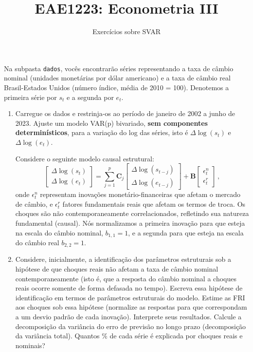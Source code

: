 \documentclass[10pt,a4paper]{article}
\title{\large EAE1223: Econometria III}
\author{\normalsize Exercícios sobre SVAR}
\date{}
\begin{document}
	\maketitle
	Na subpasta \texttt{dados}, vocês encontrarão séries representando a taxa de câmbio nominal (unidades monetárias por dólar americano) e a taxa de câmbio real Brasil-Estados Unidos (número índice, média de 2010 = 100). Denotemos a primeira série por $s_t$ e a segunda por $e_t$.

\begin{enumerate}
	\item Carregue os dados e restrinja-os ao período de janeiro de 2002 a junho de 2023. Ajuste um modelo VAR(p) bivariado, \textbf{sem componentes determinísticos}, para a variação do log das séries, isto é $\Delta \log(s_t)$ e $\Delta \log(e_t)$.
	
	\vspace{2em}
	 Considere o seguinte modelo causal estrutural:
$$\begin{bmatrix}
	\Delta \log(s_t) \\
	\Delta \log(e_t)
\end{bmatrix} = \sum_{j=1}^p \boldsymbol{C}_j \begin{bmatrix}
\Delta \log(s_{t-j}) \\
\Delta \log(e_{t-j})
\end{bmatrix} + \boldsymbol{B}\begin{bmatrix}
\epsilon^n_t \\
\epsilon^r_t
\end{bmatrix}\,,$$
onde $\epsilon^n_t$ representam inovações monetário-financeiras que afetam o mercado de câmbio, e $\epsilon^r_t$ fatores fundamentais reais que afetam os termos de troca. Os choques são não contemporaneamente correlacionados, refletindo sua natureza fundamental (causal). Nós normalizamos a primeira inovação para que esteja na escala do câmbio nominal, $b_{1,1}=1$, e a segunda para que esteja na escala do câmbio real $b_{2,2}=1$.

\item Considere, inicialmente, a identificação dos parâmetros estruturais sob a hipótese de que choques reais não afetam a taxa de câmbio nominal contemporaneamente (isto é, que a resposta do câmbio nominal a choques reais ocorre somente de forma defasada no tempo). Escreva essa hipótese de identificação em termos de parâmetros estruturais do modelo. Estime as FRI aos choques sob essa hipótese (normalize as respostas para que correspondam a um desvio padrão de cada inovação). Interprete seus resultados. Calcule a decomposição da variância do erro de previsão no longo prazo (decomposição da variância total). Quantos \% de cada série é explicada por choques reais e nominais?


\end{enumerate}
\end{document}
